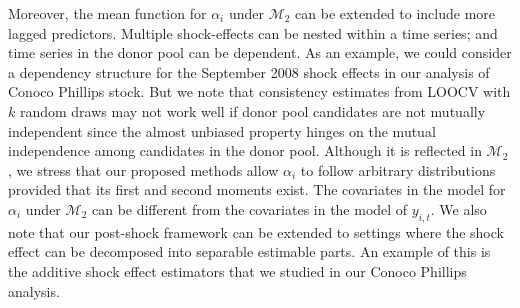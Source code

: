 \documentclass[11pt]{article}
\def\mc#1{\mathcal{#1}} %
\theoremstyle{definition}
\begin{document}
Moreover, the mean function for $\alpha_i$ under $\mc{M}_2$ can be extended to include more lagged predictors. Multiple shock-effects can be nested within a time series; and time series in the donor pool can be dependent. As an example, we could consider a dependency structure for the September 2008 shock effects in our analysis of Conoco Phillips stock. But we note that consistency estimates from LOOCV with $k$ random draws may not work well if donor pool candidates are not mutually independent since the almost unbiased property hinges on the mutual independence among candidates in the donor pool.
Although it is reflected in $\mc{M}_2$, we stress that our proposed methods allow $\alpha_i$ to follow arbitrary distributions provided that its first and second moments exist. The covariates in the model for $\alpha_i$ under $\mc{M}_2$ can be different from the covariates in the model of $y_{i,t}$. We also note that our post-shock framework can be extended to settings where the shock effect can be decomposed into separable estimable parts. An example of this is the additive shock effect estimators that we studied in our Conoco Phillips analysis. 
\end{document}
